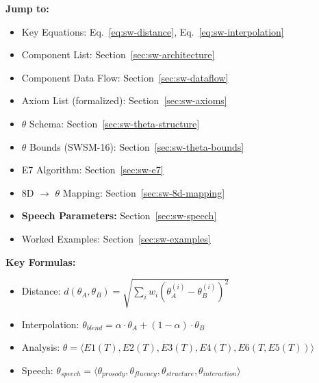 \begin{tcolorbox}[colback=yellow!5!white, colframe=yellow!75!black, title=Quick Reference]
\textbf{Jump to:}
\begin{itemize}
    \item Key Equations: Eq.~\ref{eq:sw-distance}, Eq.~\ref{eq:sw-interpolation}
    \item Component List: Section~\ref{sec:sw-architecture}
    \item Component Data Flow: Section~\ref{sec:sw-dataflow}
    \item Axiom List (formalized): Section~\ref{sec:sw-axioms}
    \item $\theta$ Schema: Section~\ref{sec:sw-theta-structure}
    \item $\theta$ Bounds (SWSM-16): Section~\ref{sec:sw-theta-bounds}
    \item E7 Algorithm: Section~\ref{sec:sw-e7}
    \item 8D $\rightarrow$ $\theta$ Mapping: Section~\ref{sec:sw-8d-mapping}
    \item \textbf{Speech Parameters:} Section~\ref{sec:sw-speech}
    \item Worked Examples: Section~\ref{sec:sw-examples}
\end{itemize}

\textbf{Key Formulas:}
\begin{itemize}
    \item Distance: $d(\theta_A, \theta_B) = \sqrt{\sum_i w_i (\theta_A^{(i)} - \theta_B^{(i)})^2}$
    \item Interpolation: $\theta_{blend} = \alpha \cdot \theta_A + (1-\alpha) \cdot \theta_B$
    \item Analysis: $\theta = \langle E1(T), E2(T), E3(T), E4(T), E6(T, E5(T)) \rangle$
    \item Speech: $\theta_{speech} = \langle \theta_{prosody}, \theta_{fluency}, \theta_{structure}, \theta_{interaction} \rangle$
\end{itemize}
\end{tcolorbox}


